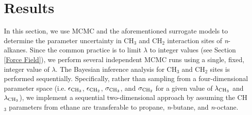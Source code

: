 \documentclass[journal=jctc,manuscript=article]{achemso}
\begin{document}
\section{Results} \label{Results}



%
%
%

In this section, we use MCMC and the aforementioned surrogate models to determine the parameter uncertainty in CH$_3$ and CH$_2$ interaction sites of \textit{n}-alkanes. Since the common practice is to limit $\lambda$ to integer values (see Section \ref{Force Field}), we perform several independent MCMC runs using a single, fixed, integer value of $\lambda$. The Bayesian inference analysis for CH$_3$ and CH$_2$ sites is performed sequentially. Specifically, rather than sampling from a four-dimensional parameter space (i.e. $\epsilon_{\rm CH_3}$, $\epsilon_{\rm CH_2}$, $\sigma_{\rm CH_3}$, and $\sigma_{\rm CH_2}$ for a given value of $\lambda_{\rm CH_3}$ and $\lambda_{\rm CH_2}$), we implement a sequential two-dimensional approach by assuming the CH$_3$ parameters from ethane are transferable to propane, \textit{n}-butane, and \textit{n}-octane. 
\end{document}
